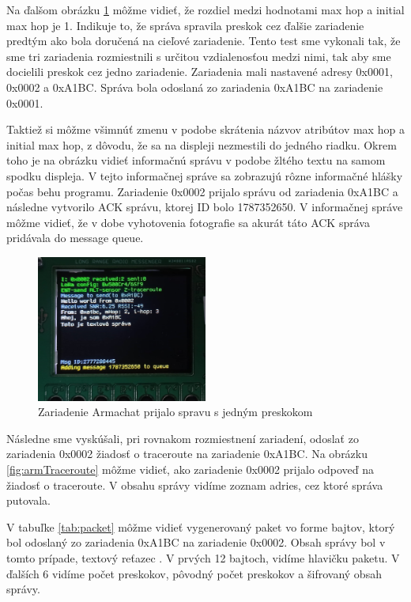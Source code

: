 \documentclass[slovak,master]{diploma}
\begin{document}
Na ďalšom obrázku \ref{fig:armRec2} môžme vidieť, že rozdiel medzi hodnotami max hop a initial max hop je 1. Indikuje to, že správa spravila preskok cez ďalšie zariadenie predtým ako 
bola doručená na cieľové zariadenie. Tento test sme vykonali tak, že sme tri zariadenia rozmiestnili s určitou vzdialenosťou medzi nimi, tak aby sme docielili preskok cez jedno zariadenie. 
Zariadenia mali nastavené adresy 0x0001, 0x0002 a 0xA1BC. Správa bola odoslaná zo zariadenia 0xA1BC na zariadenie 0x0001.

Taktiež si môžme všimnúť zmenu v podobe skrátenia názvov atribútov max hop a initial max hop, z dôvodu, že sa na displeji nezmestili do jedného riadku.
Okrem toho je na obrázku vidieť informačnú správu v podobe žltého textu na samom spodku displeja. V tejto informačnej správe sa zobrazujú 
rôzne informačné hlášky počas behu programu. Zariadenie 0x0002 prijalo správu od zariadenia 0xA1BC a následne vytvorilo ACK správu, ktorej ID bolo 1787352650.
V informačnej správe môžme vidieť, že v dobe vyhotovenia fotografie sa akurát táto ACK správa pridávala do message queue.
\newpage

\begin{figure}
	\centering
	\includegraphics[width=0.5\textwidth]{Figures/armRec2.jpg}
	\caption{Zariadenie Armachat prijalo spravu s jedným preskokom}
	\label{fig:armRec2}
\end{figure}

Následne sme vyskúšali, pri rovnakom rozmiestnení zariadení, odoslať zo zariadenia 0x0002 žiadosť o traceroute na zariadenie 0xA1BC. Na obrázku \ref{fig:armTraceroute} môžme 
vidieť, ako zariadenie 0x0002 prijalo odpoveď na žiadosť o traceroute. V obsahu správy vidíme zoznam adries, cez ktoré správa putovala.

V tabuľke \ref{tab:packet} môžme vidieť vygenerovaný paket vo forme bajtov, ktorý bol odoslaný zo zariadenia 0xA1BC na zariadenie 0x0002. Obsah správy bol v tomto prípade, 
textový reťazec . V prvých 12 bajtoch, vidíme hlavičku paketu. V ďalších 6 vidíme počet preskokov, pôvodný počet preskokov a šifrovaný obsah správy.
\end{document}
